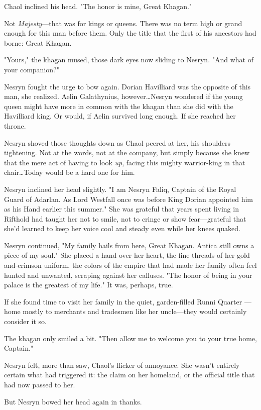 Chaol inclined his head. "The honor is mine, Great Khagan."

Not \emph{Majesty}---that was for kings or queens. There was no term high or grand enough for this man before them. Only the title that the first of his ancestors had borne: Great Khagan.

"Yours," the khagan mused, those dark eyes now sliding to Nesryn. "And what of your companion?"

Nesryn fought the urge to bow again. Dorian Havilliard was the opposite of this man, she realized. Aelin Galathynius, however\ldots Nesryn wondered if the young queen might have more in common with the khagan than she did with the Havilliard king. Or would, if Aelin survived long enough. If she reached her throne.

Nesryn shoved those thoughts down as Chaol peered at her, his shoulders tightening. Not at the words, not at the company, but simply because she knew that the mere act of having to look \emph{up}, facing this mighty warrior-king in that chair\ldots Today would be a hard one for him.

Nesryn inclined her head slightly. "I am Nesryn Faliq, Captain of the Royal Guard of Adarlan. As Lord Westfall once was before King Dorian appointed him as his Hand earlier this summer." She was grateful that years spent living in Rifthold had taught her not to smile, not to cringe or show fear---grateful that she'd learned to keep her voice cool and steady even while her knees quaked.

Nesryn continued, "My family hails from here, Great Khagan. Antica still owns a piece of my soul." She placed a hand over her heart, the fine threads of her gold-and-crimson uniform, the colors of the empire that had made her family often feel hunted and unwanted, scraping against her calluses. "The honor of being in your palace is the greatest of my life." It was, perhaps, true.

If she found time to visit her family in the quiet, garden-filled Runni Quarter ---home mostly to merchants and tradesmen like her uncle---they would certainly consider it so.

The khagan only smiled a bit. "Then allow me to welcome you to your true home, Captain."

Nesryn felt, more than saw, Chaol's flicker of annoyance. She wasn't entirely certain what had triggered it: the claim on her homeland, or the official title that had now passed to her.

But Nesryn bowed her head again in thanks.

